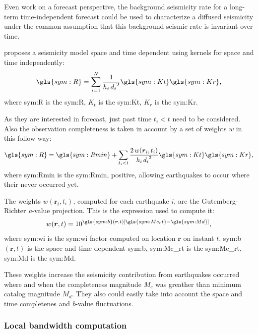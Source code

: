 \documentclass[draft, grl]{agutex}
\begin{document}
\begin{article}
Even work on a forecast perspective, the background seismicity rate for a long-term time-independent forecast could be used to characterize a diffused seismicity under the common assumption that this background seismic rate is invariant over time.

\citet{helmstetter_2012} proposes a seismicity model space and time dependent using kernels for space and time independently:
\begin{equation}
	\ensuremath{\gls{sym:R} = \sum_{i=1}^{N}{ \frac{1}{h_i\,{d_i}^2} \gls{sym:Kt}\gls{sym:Kr} }},
	\label{eq:helms01}
\end{equation}
where \gls{sym:R} is the \glsdesc{sym:R},
	  $K_t$ is the \glsdesc{sym:Kt},
	  $K_r$ is the \glsdesc{sym:Kr}.


As they are interested in forecast, just past time $t_i < t$ need to be considered. Also the observation completeness is taken in account by a set of weights $w$ in this follow way:
\begin{equation}
\ensuremath{\gls{sym:R} = \gls{sym:Rmin} + \sum_{t_i < t}{
	\frac{2\,w(\boldsymbol{r}_i,t_i)}{h_i\,{d_i}^2}
			\gls{sym:Kt}\gls{sym:Kr} }},
	\label{eq:helms02}
\end{equation}
where \gls{sym:Rmin} is the \glsdesc{sym:Rmin}, positive, allowing earthquakes to occur where their never occurred yet.

The weights $w(\boldsymbol{r}_i,t_i)$, computed for each earthquake $i$, are the Gutemberg-Richter \emph{a}-value projection. This is the expression used to compute it:
\begin{equation}
	\ensuremath{ w(\boldsymbol{r},t) = 10^{ \gls{sym:b}(\boldsymbol{r},t) \left[ \gls{sym:Mc_rt} - \gls{sym:Md}
	\right] } },
	\label{eq:helms_wi}
\end{equation}
where \gls{sym:wi} is the \glsdesc{sym:wi} factor computed on location $\boldsymbol{r}$ on instant $t$,
	  \gls{sym:b}$(\boldsymbol{r},t)$ is the space and time dependent \glsdesc{sym:b},
	  \gls{sym:Mc_rt} is the \glsdesc{sym:Mc_rt},
	  \gls{sym:Md} is the \glsdesc{sym:Md}.

These weights increase the seismicity contribution from earthquakes occurred where and when the completeness magnitude $M_c$ was greather than minimum catalog magnitude $M_d$. They also could easily take into account the space and time completenes and \emph{b}-value fluctuations. 


\subsubsection{Local bandwidth computation}


\end{article}
\end{document}
